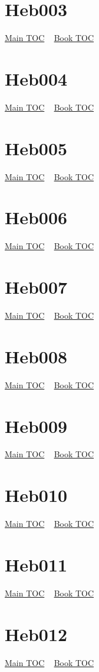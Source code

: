 \documentclass{book}
\begin{document}
  \section{Heb003}\hyperlink{toc}{Main TOC} ~ \hyperref[subsec:Heb]{Book TOC} 
  \section{Heb004}\hyperlink{toc}{Main TOC} ~ \hyperref[subsec:Heb]{Book TOC} 
  \section{Heb005}\hyperlink{toc}{Main TOC} ~ \hyperref[subsec:Heb]{Book TOC} 
  \section{Heb006}\hyperlink{toc}{Main TOC} ~ \hyperref[subsec:Heb]{Book TOC} 
  \section{Heb007}\hyperlink{toc}{Main TOC} ~ \hyperref[subsec:Heb]{Book TOC} 
  \section{Heb008}\hyperlink{toc}{Main TOC} ~ \hyperref[subsec:Heb]{Book TOC} 
  \section{Heb009}\hyperlink{toc}{Main TOC} ~ \hyperref[subsec:Heb]{Book TOC} 
  \section{Heb010}\hyperlink{toc}{Main TOC} ~ \hyperref[subsec:Heb]{Book TOC} 
  \section{Heb011}\hyperlink{toc}{Main TOC} ~ \hyperref[subsec:Heb]{Book TOC} 
  \section{Heb012}\hyperlink{toc}{Main TOC} ~ \hyperref[subsec:Heb]{Book TOC} 
\end{document}
